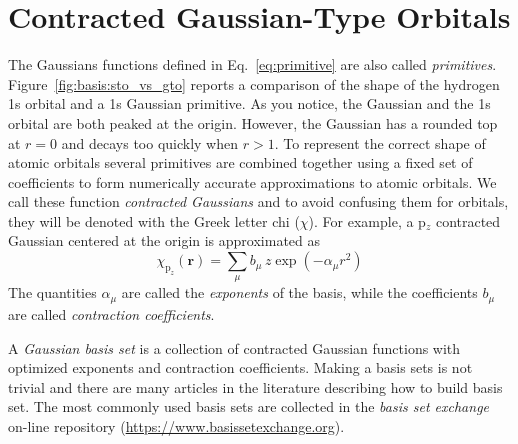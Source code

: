 \documentclass[../Main/notes.tex]{subfiles}
\begin{document}
\section{Contracted Gaussian-Type Orbitals}
The Gaussians functions defined in Eq.~\eqref{eq:primitive} are also called \emph{primitives}.
Figure~\ref{fig:basis:sto_vs_gto} reports a comparison of the shape of the hydrogen 1s orbital and a 1s Gaussian primitive.
As you notice, the Gaussian and the 1s orbital are both peaked at the origin.
However, the Gaussian has a rounded top at $r = 0$ and decays too quickly when $r > 1$.
To represent the correct shape of atomic orbitals several primitives are combined together using a fixed set of coefficients to form numerically accurate approximations to atomic orbitals.
We call these function \emph{contracted Gaussians} and to avoid confusing them for orbitals, they will be denoted with the Greek letter chi ($\chi$).
For example, a p$_z$ contracted Gaussian centered at the origin is approximated as
\begin{equation}
\chi_{\mathrm{p}_z}(\mathbf{r}) = 
\sum_\mu b_\mu \, z \exp(- \alpha_\mu r^2)
\end{equation}
The quantities $\alpha_\mu$ are called the \emph{exponents} of the basis, while the coefficients $b_\mu$ are called \emph{contraction coefficients}.

A \emph{Gaussian basis set} is a collection of contracted Gaussian functions with optimized exponents and contraction coefficients.
Making a basis sets is not trivial and there are many articles in the literature describing how to build basis set.
The most commonly used basis sets are collected in the \emph{basis set exchange} on-line repository  (\url{https://www.basissetexchange.org}).
\end{document}
